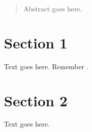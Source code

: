 

\begin{abstract}
    Abstract goes here.
\end{abstract}

\section{Section 1}

Text goes here.  Remember .

\section{Section 2}

Text goes here.